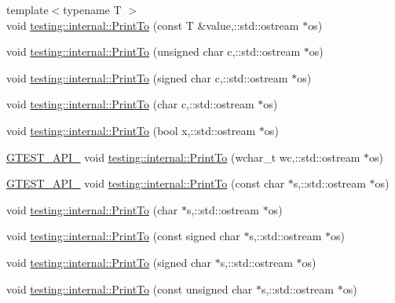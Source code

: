 \begin{DoxyCompactItemize}
\item 
{\footnotesize template$<$typename T $>$ }\\void \hyperlink{namespacetesting_1_1internal_a46859938b459a1581ec760755bc81fc7}{testing\-::internal\-::\-Print\-To} (const T \&value,\-::std\-::ostream $\ast$os)
\item 
void \hyperlink{namespacetesting_1_1internal_abae1a8d465376b68576918205ad706a9}{testing\-::internal\-::\-Print\-To} (unsigned char c,\-::std\-::ostream $\ast$os)
\item 
void \hyperlink{namespacetesting_1_1internal_a09f551128c4d165c37004e36ccc87aa0}{testing\-::internal\-::\-Print\-To} (signed char c,\-::std\-::ostream $\ast$os)
\item 
void \hyperlink{namespacetesting_1_1internal_ae91b06a9e343f5ddabff85626a7d507a}{testing\-::internal\-::\-Print\-To} (char c,\-::std\-::ostream $\ast$os)
\item 
void \hyperlink{namespacetesting_1_1internal_a832beb8c56070fc5c175b8bfd8bbeba0}{testing\-::internal\-::\-Print\-To} (bool x,\-::std\-::ostream $\ast$os)
\item 
\hyperlink{gtest-port_8h_aa73be6f0ba4a7456180a94904ce17790}{G\-T\-E\-S\-T\-\_\-\-A\-P\-I\-\_\-} void \hyperlink{namespacetesting_1_1internal_a3802453cf4e3f4870f589c69c7b43b2b}{testing\-::internal\-::\-Print\-To} (wchar\-\_\-t wc,\-::std\-::ostream $\ast$os)
\item 
\hyperlink{gtest-port_8h_aa73be6f0ba4a7456180a94904ce17790}{G\-T\-E\-S\-T\-\_\-\-A\-P\-I\-\_\-} void \hyperlink{namespacetesting_1_1internal_afc6dad64c4dd4799036f252c07d8a59f}{testing\-::internal\-::\-Print\-To} (const char $\ast$s,\-::std\-::ostream $\ast$os)
\item 
void \hyperlink{namespacetesting_1_1internal_ae04a499cedbda0b244c216211081a8b6}{testing\-::internal\-::\-Print\-To} (char $\ast$s,\-::std\-::ostream $\ast$os)
\item 
void \hyperlink{namespacetesting_1_1internal_af4616278b2c3ac265ad80481e0ce8da7}{testing\-::internal\-::\-Print\-To} (const signed char $\ast$s,\-::std\-::ostream $\ast$os)
\item 
void \hyperlink{namespacetesting_1_1internal_abac47db29a65b1633028fe8001f57212}{testing\-::internal\-::\-Print\-To} (signed char $\ast$s,\-::std\-::ostream $\ast$os)
\item 
void \hyperlink{namespacetesting_1_1internal_a96409c0b7d8ce520c40a0aa5eb9280b6}{testing\-::internal\-::\-Print\-To} (const unsigned char $\ast$s,\-::std\-::ostream $\ast$os)
\item 

\end{DoxyCompactItemize}

